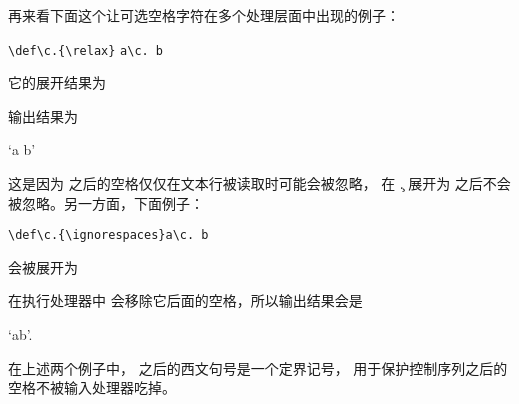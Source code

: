 \documentclass{book}
\begin{document}
再来看下面这个让可选空格字符在多个处理层面中出现的例子：
\begin{disp}\verb>\def\c.{\relax}>\nl
     \verb>a\c.>{\tt{} b}\end{disp}
它的展开结果为
\begin{disp}\end{disp}
输出结果为
\begin{disp} `a b'\end{disp}
这是因为  之后的空格仅仅在文本行被读取时可能会被忽略，
在 \c. 展开为  之后不会被忽略。另一方面，下面例子：
\begin{disp} \verb-\def\c.{\ignorespaces}-\nl \verb-a\c. b-\end{disp}
会被展开为
\begin{disp}\end{disp}
在执行处理器中  会移除它后面的空格，所以输出结果会是
\begin{disp} `ab'.\end{disp}
在上述两个例子中， 之后的西文句号是一个定界记号，
用于保护控制序列之后的空格不被输入处理器吃掉。

\end{document}
